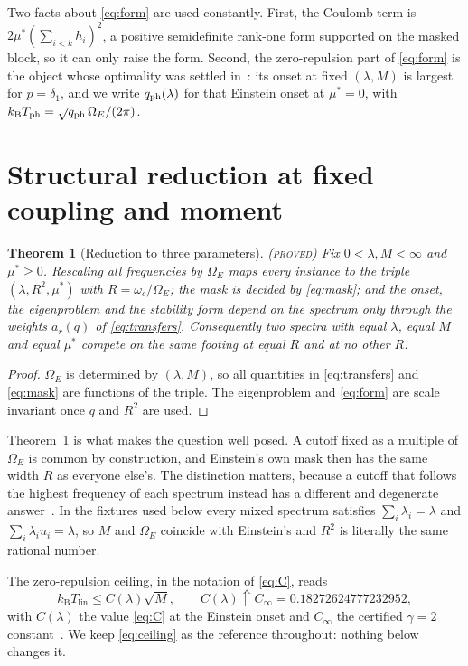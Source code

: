 \documentclass[11pt]{article}
\newcommand{\kb}{k_{\mathrm B}}
\newcommand{\Tlin}{T_{\mathrm{lin}}}
\newcommand{\OmE}{\Omega_E}
\newcommand{\muS}{\mu^{*}}
\newtheorem{theorem}{Theorem}[section]
\theoremstyle{definition}
\theoremstyle{remark}
\newcommand{\proved}{\textnormal{\textsc{(proved)}}}
\begin{document}
Two facts about \eqref{eq:form} are used constantly. First, the Coulomb term is
$2\muS(\sum_{i<k}h_i)^2$, a positive semidefinite rank-one form supported on the masked
block, so it can only raise the form. Second, the zero-repulsion part of \eqref{eq:form}
is the object whose optimality was settled in~\cite{rens,kondratev}: its onset at fixed
$(\lambda,M)$ is largest for $p=\delta_1$, and we write $q_{\rm ph}(\lambda)$ for that
Einstein onset at $\muS=0$, with $\kb T_{\rm ph}=\sqrt{q_{\rm ph}}\,\OmE/(2\pi)$.

\section{Structural reduction at fixed coupling and moment}\label{sec:reduce}

\begin{theorem}[Reduction to three parameters]\label{thm:reduce}\proved
Fix $0<\lambda,M<\infty$ and $\muS\ge0$. Rescaling all frequencies by $\OmE$ maps every
instance to the triple $(\lambda,R^2,\muS)$ with $R=\omega_c/\OmE$; the mask is decided by
\eqref{eq:mask}; and the onset, the eigenproblem and the stability form depend on the
spectrum only through the weights $a_r(q)$ of \eqref{eq:transfers}. Consequently two
spectra with equal $\lambda$, equal $M$ and equal $\muS$ compete on the same footing at
equal $R$ and at no other $R$.
\end{theorem}
\begin{proof}
$\OmE$ is determined by $(\lambda,M)$, so all quantities in \eqref{eq:transfers} and
\eqref{eq:mask} are functions of the triple. The eigenproblem and \eqref{eq:form} are
scale invariant once $q$ and $R^2$ are used.
\end{proof}

Theorem~\ref{thm:reduce} is what makes the question well posed. A cutoff fixed as a
multiple of $\OmE$ is common by construction, and Einstein's own mask then has the same
width $R$ as everyone else's. The distinction matters, because a cutoff that follows the
highest frequency of each spectrum instead has a different and degenerate
answer~\cite{rens,finiteband}. In the fixtures used below every mixed spectrum satisfies
$\sum_i\lambda_i=\lambda$ and $\sum_i\lambda_iu_i=\lambda$, so $M$ and $\OmE$ coincide with
Einstein's and $R^2$ is literally the same rational number.

The zero-repulsion ceiling, in the notation of \eqref{eq:C}, reads
\begin{equation}\label{eq:ceiling}
\kb\Tlin\le C(\lambda)\sqrt M,\qquad C(\lambda)\Uparrow C_\infty=0.18272624777232952,
\end{equation}
with $C(\lambda)$ the value \eqref{eq:C} at the Einstein onset and $C_\infty$ the
certified $\gamma=2$ constant~\cite{gamma,finiteband}. We keep \eqref{eq:ceiling} as the
reference throughout: nothing below changes it.
\end{document}
